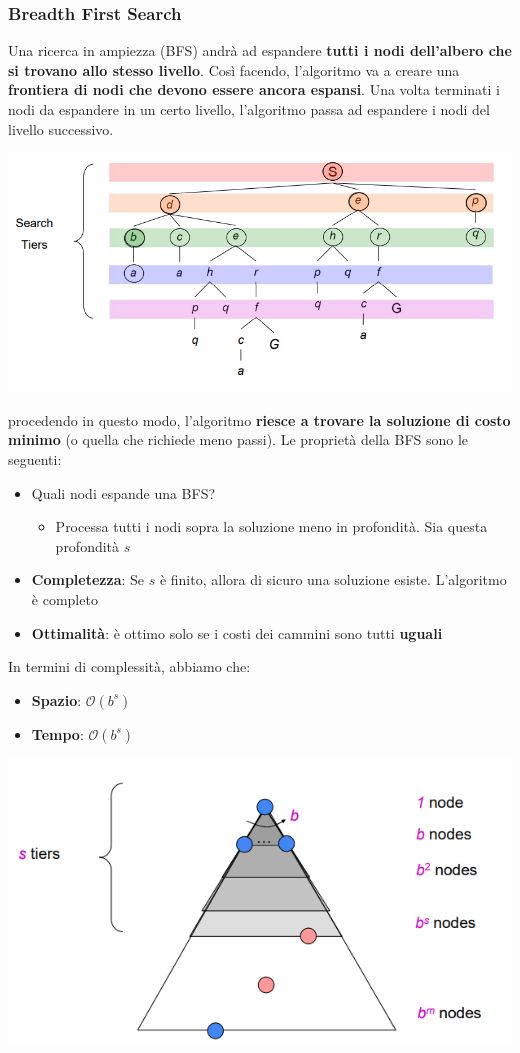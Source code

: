 \documentclass[12pt]{article}
\begin{document}
\subsubsection{Breadth First Search}
Una ricerca in ampiezza (BFS) andrà ad espandere \textbf{tutti i nodi dell'albero che si trovano allo stesso livello}. Così facendo, l'algoritmo
va a creare una \textbf{frontiera di nodi che devono essere ancora espansi}. Una volta terminati i nodi da espandere in un certo livello, l'algoritmo
passa ad espandere i nodi del livello successivo.
\begin{center}
    \includegraphics[width = 0.70\linewidth]{Images/31.PNG}
\end{center}
procedendo in questo modo, l'algoritmo \textbf{riesce a trovare la soluzione di costo minimo} (o quella che richiede meno passi).
Le proprietà della BFS sono le seguenti:
\begin{itemize}
    \item Quali nodi espande una BFS?
    \begin{itemize}
        \item Processa tutti i nodi sopra la soluzione meno in profondità. Sia questa profondità $s$
    \end{itemize}
    \item \textbf{Completezza}: Se $s$ è finito, allora di sicuro una soluzione esiste. L'algoritmo è completo
    \item \textbf{Ottimalità}: è ottimo solo se i costi dei cammini sono tutti \textbf{uguali}
\end{itemize}
In termini di complessità, abbiamo che:
\begin{itemize}
    \item \textbf{Spazio}: $\mathcal{O}(b^s)$
    \item \textbf{Tempo}: $\mathcal{O}(b^s)$
\end{itemize}
\begin{center}
    \includegraphics[width = 0.70\linewidth]{Images/32.PNG}
\end{center}
\end{document}
